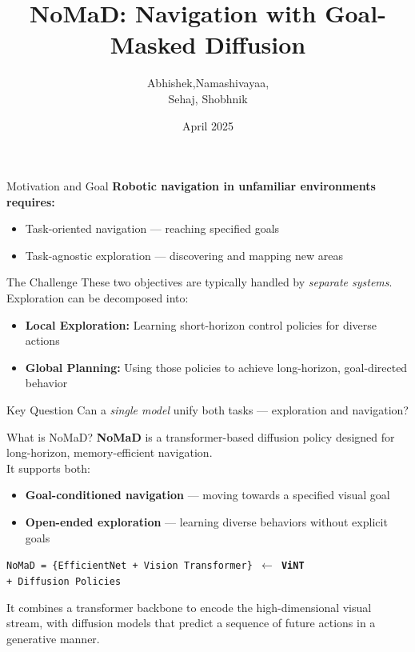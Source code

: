 \documentclass{beamer}
\title[NoMaD]{NoMaD: \textbf{N}avigati\textbf{o}n with Goal-\textbf{Ma}sked \textbf{D}iffusion}
\author{Abhishek,Namashivayaa, \\ Sehaj, Shobhnik}
\institute{IISc Bengaluru \newline BTech. Mathematics and Computing}
\date{April 2025}
\begin{document}
\begin{frame}
\titlepage
\end{frame}

\begin{frame}{Motivation and Goal}
    \textbf{Robotic navigation in unfamiliar environments requires:}
    \begin{itemize}
        \item Task-oriented navigation — reaching specified goals
        \item Task-agnostic exploration — discovering and mapping new areas
    \end{itemize}
    \pause
    \begin{block}{The Challenge}
        These two objectives are typically handled by \textit{separate systems}.\\[1ex]
        Exploration can be decomposed into:
        \begin{itemize}
            \item \textbf{Local Exploration:} Learning short-horizon control policies for diverse actions
            \item \textbf{Global Planning:} Using those policies to achieve long-horizon, goal-directed behavior
        \end{itemize}
    \end{block}
    \pause
    \begin{block}{Key Question}
        Can a \textit{single model} unify both tasks — exploration and navigation?
    \end{block}
    \end{frame}
    \begin{frame}{What is NoMaD?}
        \textbf{NoMaD} is a transformer-based diffusion policy designed for long-horizon, memory-efficient navigation.\\[0.5em]
        It supports both:
        \begin{itemize}
            \item \textbf{Goal-conditioned navigation} — moving towards a specified visual goal
            \item \textbf{Open-ended exploration} — learning diverse behaviors without explicit goals
        \end{itemize}
        \pause
        \bigskip
        \texttt{NoMaD = \{EfficientNet + Vision Transformer\} $\leftarrow$ \textbf{ViNT} \\+ Diffusion Policies}
        \pause
        \bigskip
        \begin{block}{}
            It combines a transformer backbone to encode the high-dimensional visual stream, with diffusion models that predict a sequence of future actions in a generative manner.
        \end{block}
        \end{frame}
\end{document}
